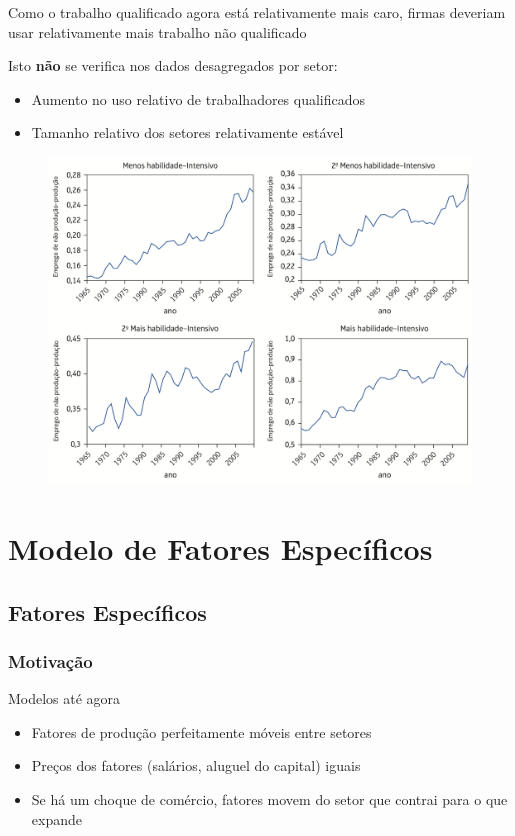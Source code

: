 \documentclass[a4paper,12pt]{article}[abntex2]
\begin{document}
Como o trabalho qualificado agora está relativamente mais caro, firmas deveriam usar relativamente mais trabalho não qualificado

Isto \textbf{não} se verifica nos dados desagregados por setor:
\begin{itemize}
    \item Aumento no uso relativo de trabalhadores qualificados
    \item Tamanho relativo dos setores relativamente estável
\end{itemize}

\begin{figure}[H]
    \centering
    \includegraphics[width=0.7\linewidth]{Imagens/a13i11.png}
\end{figure}

\newpage
\section{\textbf{Modelo de Fatores Específicos}}
\subsection{\textbf{Fatores Específicos}}
\subsubsection{\textbf{Motivação}}
Modelos até agora
\begin{itemize}
    \item Fatores de produção perfeitamente móveis entre setores
    \item Preços dos fatores (salários, aluguel do capital) iguais
    \item Se há um choque de comércio, fatores movem do setor que contrai para o que expande
\end{itemize}
\end{document}
